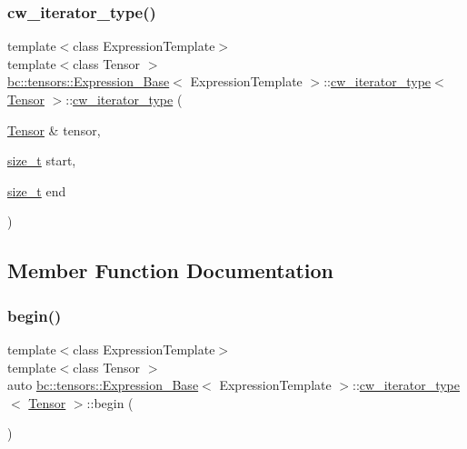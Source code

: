 \subsubsection{\texorpdfstring{cw\+\_\+iterator\+\_\+type()}{cw\_iterator\_type()}\hspace{0.1cm}{\footnotesize\ttfamily [3/3]}}
{\footnotesize\ttfamily template$<$class Expression\+Template$>$ \\
template$<$class Tensor $>$ \\
\hyperlink{classbc_1_1tensors_1_1Expression__Base}{bc\+::tensors\+::\+Expression\+\_\+\+Base}$<$ Expression\+Template $>$\+::\hyperlink{structbc_1_1tensors_1_1Expression__Base_1_1cw__iterator__type}{cw\+\_\+iterator\+\_\+type}$<$ \hyperlink{namespacebc_a659391e47ab612be3ba6c18cf9c89159}{Tensor} $>$\+::\hyperlink{structbc_1_1tensors_1_1Expression__Base_1_1cw__iterator__type}{cw\+\_\+iterator\+\_\+type} (\begin{DoxyParamCaption}\item[{\hyperlink{namespacebc_a659391e47ab612be3ba6c18cf9c89159}{Tensor} \&}]{tensor,  }\item[{\hyperlink{structbc_1_1tensors_1_1Expression__Base_1_1cw__iterator__type_a1423458dda5ab2bd7c7ade4f69fbf081}{size\+\_\+t}}]{start,  }\item[{\hyperlink{structbc_1_1tensors_1_1Expression__Base_1_1cw__iterator__type_a1423458dda5ab2bd7c7ade4f69fbf081}{size\+\_\+t}}]{end }\end{DoxyParamCaption})\hspace{0.3cm}{\ttfamily [inline]}}



\subsection{Member Function Documentation}
\mbox{\label{structbc_1_1tensors_1_1Expression__Base_1_1cw__iterator__type_a7303de5723b603749a3080c432d0c822}} 
\subsubsection{\texorpdfstring{begin()}{begin()}}
{\footnotesize\ttfamily template$<$class Expression\+Template$>$ \\
template$<$class Tensor $>$ \\
auto \hyperlink{classbc_1_1tensors_1_1Expression__Base}{bc\+::tensors\+::\+Expression\+\_\+\+Base}$<$ Expression\+Template $>$\+::\hyperlink{structbc_1_1tensors_1_1Expression__Base_1_1cw__iterator__type}{cw\+\_\+iterator\+\_\+type}$<$ \hyperlink{namespacebc_a659391e47ab612be3ba6c18cf9c89159}{Tensor} $>$\+::begin (\begin{DoxyParamCaption}{ }\end{DoxyParamCaption})\hspace{0.3cm}{\ttfamily [inline]}}

